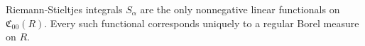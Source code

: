 Riemann-Stieltjes integrals $S_{\alpha}$ are the only nonnegative linear functionals on $\mathfrak{C}_{00}(R)$. Every such functional corresponds uniquely to a regular Borel measure on $R$.
